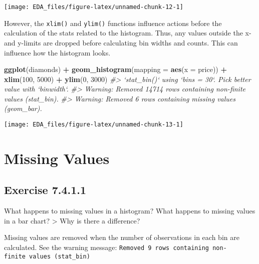 \documentclass[]{book}
\newenvironment{Shaded}{\begin{snugshade}}{\end{snugshade}}
\newcommand{\CommentTok}[1]{\textcolor[rgb]{0.56,0.35,0.01}{\textit{#1}}}
\newcommand{\DataTypeTok}[1]{\textcolor[rgb]{0.13,0.29,0.53}{#1}}
\newcommand{\DecValTok}[1]{\textcolor[rgb]{0.00,0.00,0.81}{#1}}
\newcommand{\KeywordTok}[1]{\textcolor[rgb]{0.13,0.29,0.53}{\textbf{#1}}}
\newcommand{\NormalTok}[1]{#1}
\newcommand{\OperatorTok}[1]{\textcolor[rgb]{0.81,0.36,0.00}{\textbf{#1}}}
\newcommand{\StringTok}[1]{\textcolor[rgb]{0.31,0.60,0.02}{#1}}
\theoremstyle{plain}
\theoremstyle{remark}
\begin{document}
\begin{center}\texttt{[image: EDA\_files/figure-latex/unnamed-chunk-12-1]} \end{center}

However, the \texttt{xlim()} and \texttt{ylim()} functions influence
actions before the calculation of the stats related to the histogram.
Thus, any values outside the x- and y-limits are dropped before
calculating bin widths and counts. This can influence how the histogram
looks.

\begin{Shaded}
\begin{Highlighting}[]
\KeywordTok{ggplot}\NormalTok{(diamonds) }\OperatorTok{+}
\StringTok{  }\KeywordTok{geom_histogram}\NormalTok{(}\DataTypeTok{mapping =} \KeywordTok{aes}\NormalTok{(}\DataTypeTok{x =}\NormalTok{ price)) }\OperatorTok{+}
\StringTok{  }\KeywordTok{xlim}\NormalTok{(}\DecValTok{100}\NormalTok{, }\DecValTok{5000}\NormalTok{) }\OperatorTok{+}
\StringTok{  }\KeywordTok{ylim}\NormalTok{(}\DecValTok{0}\NormalTok{, }\DecValTok{3000}\NormalTok{)}
\CommentTok{#> `stat_bin()` using `bins = 30`. Pick better value with `binwidth`.}
\CommentTok{#> Warning: Removed 14714 rows containing non-finite values (stat_bin).}
\CommentTok{#> Warning: Removed 6 rows containing missing values (geom_bar).}
\end{Highlighting}
\end{Shaded}

\begin{center}\texttt{[image: EDA\_files/figure-latex/unnamed-chunk-13-1]} \end{center}

\hypertarget{missing-values}{%
\section{Missing Values}\label{missing-values}}

\hypertarget{exercise-7.4.1.1}{%
\subsection*{\texorpdfstring{Exercise
{7.4.1.1}}{Exercise 7.4.1.1}}\label{exercise-7.4.1.1}}

What happens to missing values in a histogram? What happens to missing
values in a bar chart? \textgreater{} Why is there a difference?

Missing values are removed when the number of observations in each bin
are calculated. See the warning message:
\texttt{Removed\ 9\ rows\ containing\ non-finite\ values\ (stat\_bin)}
\end{document}
